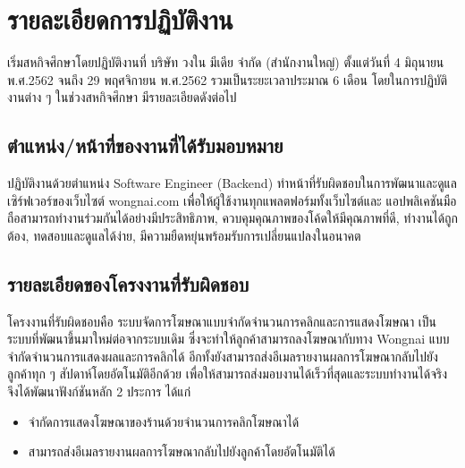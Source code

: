 \chapter{รายละเอียดการปฏิบัติงาน}
\label{chapter:working-detail}

เริ่มสหกิจศึกษาโดยปฏิบัติงานที่ บริษัท วงใน มีเดีย จำกัด (สำนักงานใหญ่) ตั้งแต่วันที่ 4 มิถุนายน พ.ศ.2562 จนถึง 29 พฤศจิกายน พ.ศ.2562 รวมเป็นระยะเวลาประมาณ 6 เดือน โดยในการปฏิบัติงานต่าง ๆ ในช่วงสหกิจศึกษา มีรายละเอียดดังต่อไป

\section{ตำแหน่ง/หน้าที่ของงานที่ได้รับมอบหมาย}
ปฏิบัติงานด้วยตำแหน่ง Software Engineer (Backend) ทำหน้าที่รับผิดชอบในการพัฒนาและดูแลเซิร์ฟเวอร์ของเว็บไซต์ wongnai.com เพื่อให้ผู้ใช้งานทุกแพลตฟอร์มทั้งเว็บไซต์และ แอปพลิเคชันมือถือสามารถทำงานร่วมกันได้อย่างมีประสิทธิภาพ, ควบคุมคุณภาพของโค้ดให้มีคุณภาพที่ดี, ทำงานได้ถูกต้อง, ทดสอบและดูแลได้ง่าย, มีความยืดหยุ่นพร้อมรับการเปลี่ยนแปลงในอนาคต

\section{รายละเอียดของโครงงานที่รับผิดชอบ}
โครงงานที่รับผิดชอบคือ ระบบจัดการโฆษณาแบบจำกัดจำนวนการคลิกและการแสดงโฆษณา เป็นระบบที่พัฒนาขึ้นมาใหม่ต่อจากระบบเดิม ซึ่งจะทำให้ลูกค้าสามารถลงโฆษณากับทาง Wongnai แบบจำกัดจำนวนการแสดงผลและการคลิกได้ อีกทั้งยังสามารถส่งอีเมลรายงานผลการโฆษณากลับไปยังลูกค้าทุก ๆ สัปดาห์โดยอัตโนมัติอีกด้วย เพื่อให้สามารถส่งมอบงานได้เร็วที่สุดและระบบทำงานได้จริง จึงได้พัฒนาฟังก์ชันหลัก 2 ประการ ได้แก่
\begin{itemize}
	\item จำกัดการแสดงโฆษณาของร้านด้วยจำนวนการคลิกโฆษณาได้
	\item สามารถส่งอีเมลรายงานผลการโฆษณากลับไปยังลูกค้าโดยอัตโนมัติได้
\end{itemize}

